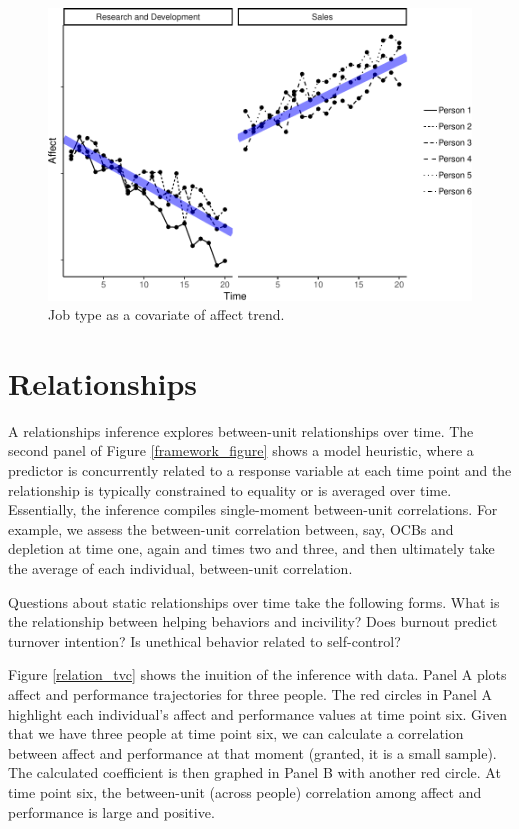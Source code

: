 \documentclass[english,,man]{apa6}
\theoremstyle{definition}
\theoremstyle{definition}
\theoremstyle{definition}
\theoremstyle{remark}
\begin{document}
\begin{figure}
\centering
\includegraphics{figures/unnamed-chunk-11-1.pdf}
\caption{\label{fig:unnamed-chunk-11}Job type as a covariate of affect
trend.\label{trend_covariate}}
\end{figure}

\hypertarget{relationships}{%
\section{Relationships}\label{relationships}}

A relationships inference explores between-unit relationships over time.
The second panel of Figure \ref{framework_figure} shows a model
heuristic, where a predictor is concurrently related to a response
variable at each time point and the relationship is typically
constrained to equality or is averaged over time. Essentially, the
inference compiles single-moment between-unit correlations. For example,
we assess the between-unit correlation between, say, OCBs and depletion
at time one, again and times two and three, and then ultimately take the
average of each individual, between-unit correlation.

Questions about static relationships over time take the following forms.
What is the relationship between helping behaviors and incivility? Does
burnout predict turnover intention? Is unethical behavior related to
self-control?

Figure \ref{relation_tvc} shows the inuition of the inference with data.
Panel A plots affect and performance trajectories for three people. The
red circles in Panel A highlight each individual's affect and
performance values at time point six. Given that we have three people at
time point six, we can calculate a correlation between affect and
performance at that moment (granted, it is a small sample). The
calculated coefficient is then graphed in Panel B with another red
circle. At time point six, the between-unit (across people) correlation
among affect and performance is large and positive.
\end{document}
